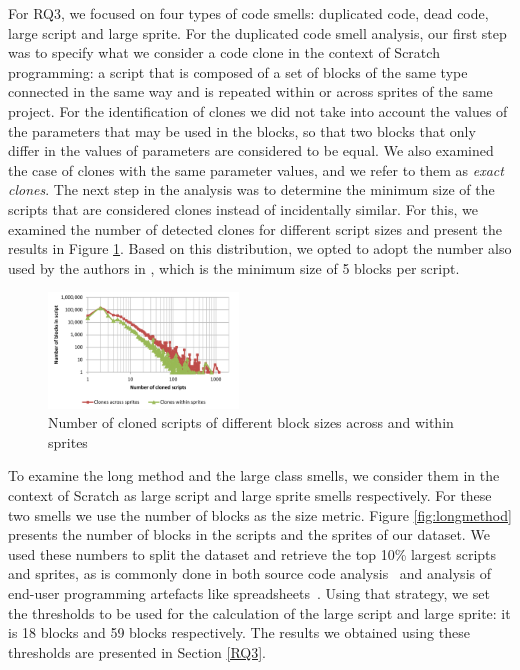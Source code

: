 \documentclass{sig-alternate}
\begin{document}
For RQ3, we focused on four types of code smells: duplicated code, dead code, large script and large sprite. For the duplicated code smell analysis, our first step was to specify what we consider a code clone in the context of Scratch programming: a script that is composed of a set of blocks of the same type connected in the same way and is repeated within or across sprites of the same project. For the identification of clones we did not take into account the values of the parameters that may be used in the blocks, so that two blocks that only differ in the values of parameters are considered to be equal. We also examined the case of clones with the same parameter values, and we refer to them as \textit{exact clones}. The next step in the analysis was to determine the minimum size of the scripts that are considered clones instead of incidentally similar. For this, we examined the number of detected clones for different script sizes and present the results in Figure \ref{fig:cloneslines}. Based on this distribution, we opted to adopt the number also used by the authors in \cite{moreno_automatic_2014}, which is the minimum size of 5 blocks per script.

\begin{figure}
	\centering
	\includegraphics[width=0.45\textwidth]{fig/charts/11cloneslines}
	\caption{Number of cloned scripts of different block sizes across and within sprites}
	\label{fig:cloneslines}
\end{figure}

To examine the long method and the large class smells, we consider them in the context of Scratch as large script and large sprite smells respectively. For these two smells we use the number of blocks as the size metric. Figure \ref{fig:longmethod} presents the number of blocks in the scripts and the sprites of our dataset. We used these numbers to split the dataset and retrieve the top 10\% largest scripts and sprites, as is commonly done in both source code analysis~\cite{alves_deriving_2010} and analysis of end-user programming artefacts like spreadsheets~\cite{hermans2015detecting}. Using that strategy, we set the thresholds to be used for the calculation of the large script and large sprite: it is 18 blocks and 59 blocks respectively. The results we obtained using these thresholds are presented in Section \ref{RQ3}.
\end{document}
